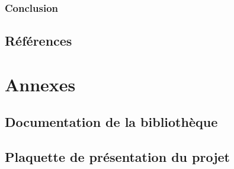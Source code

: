 \documentclass{report}
\begin{document}
		\section{Conclusion}
	
	\chapter{Références}
	
	\part{Annexes}
	\appendix
		\chapter{Documentation de la bibliothèque}
		
		\chapter{Plaquette de présentation du projet}
		
\end{document}
